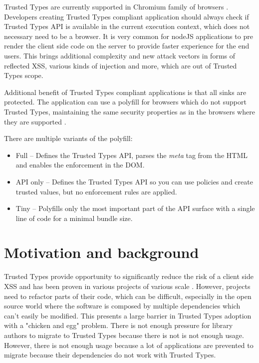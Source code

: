 Trusted Types are currently supported in Chromium family of browsers \cite{mdn:tt_compatibility}.
Developers creating Trusted Types compliant application should always check if Trusted Types API is
available in the current execution context, which does not necessary need to be a browser. It is
very common for nodeJS applications to pre render the client side code on the server to provide
faster experience for the end users. This brings additional complexity and new attack vectors in
forms of reflected XSS, various kinds of injection and more, which are out of Trusted Types scope.

Additional benefit of Trusted Types compliant applications is that all sinks are protected. The
application can use a polyfill for browsers which do not support Trusted Types, maintaining the same
security properties as in the browsers where they are supported \cite{xss_nowhere_with_polyfill}.

There are multiple variants of the polyfill:

\begin{itemize}
  \item Full -- Defines the Trusted Types API, parses the \textit{meta} tag from the HTML and
        enables the enforcement in the DOM.
  \item API only -- Defines the Trusted Types API so you can use policies and create trusted values,
        but no enforcement rules are applied.
  \item Tiny -- Polyfills only the most important part of the API surface with a single line of code
        for a minimal bundle size.
\end{itemize}

\section{Motivation and background}

Trusted Types provide opportunity to significantly reduce the risk of a client side XSS and has been
proven in various projects of various scale \cite{tt_web_framework_paper}
\cite{tt_integration_list}. However, projects need to refactor parts of their code, which can be
difficult, especially in the open source world where the software is composed by multiple
dependencies which can't easily be modified. This presents a large barrier in Trusted Types adoption
\cite{tt_web_framework_paper} with a "chicken and egg" problem. There is not enough pressure for
library authors to migrate to Trusted Types because there is not is not enough usage. However, there
is not enough usage because a lot of applications are prevented to migrate because their
dependencies do not work with Trusted Types.

